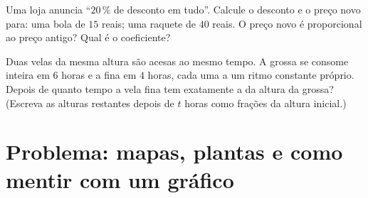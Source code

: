 \begin{exercise}[$\star\star$]\label{exo:g6:propdata:11}
Uma loja anuncia ``$20\,\%$ de desconto em tudo''. Calcule o desconto e
o preço novo para: uma bola de $15$ reais; uma raquete de $40$ reais. O
preço novo é proporcional ao preço antigo? Qual é o coeficiente?
\end{exercise}

\begin{exercise}[$\star\star\star$]\label{exo:g6:propdata:12}
Duas velas da mesma altura são acesas ao mesmo tempo. A grossa se
consome inteira em $6$ horas e a fina em $4$ horas, cada uma a um ritmo
constante próprio. Depois de quanto tempo a vela fina tem exatamente a
 da altura da grossa? (Escreva as alturas restantes depois de $t$
horas como frações da altura inicial.)
\end{exercise}

\section{Problema: mapas, plantas e como mentir com um gráfico}


